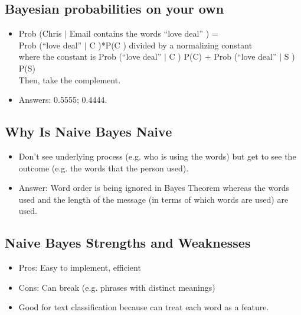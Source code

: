 \documentclass[12pt]{report}
\begin{document}
\subsection{Bayesian probabilities on your own}

\begin{itemize}
\item Prob \big(Chris $\mid$ Email contains the words ``love deal'' \big) = \\

Prob \big(``love deal'' $\mid$ C \big)*P\big(C \big) divided by a normalizing constant \\ 

where the constant is Prob \big(``love deal'' $\mid$ C \big) P\big(C) + Prob \big(``love deal'' $\mid$ S \big) P\big(S) \\

Then, take the complement.

\item Answers: 0.5555; 0.4444. 

\end{itemize}

\subsection{Why Is Naive Bayes Naive}

\begin{itemize}

\item Don't see underlying process (e.g. who is using the words) but get to see the outcome (e.g. the words that the person used). 

\item Answer: Word order is being ignored in Bayes Theorem whereas the words used and the length of the message (in terms of which words are used) are used. 

\end{itemize} 

\subsection{Naive Bayes Strengths and Weaknesses}

\begin{itemize}

\item Pros: Easy to implement, efficient

\item Cons: Can break (e.g. phrases with distinct meanings)

\item Good for text classification because can treat each word as a feature. 

\end{itemize}
\end{document}
